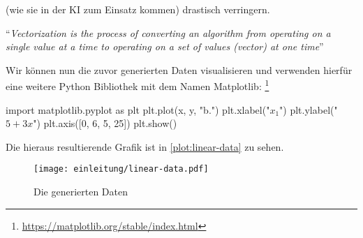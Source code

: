(wie sie in der KI zum Einsatz kommen) drastisch verringern.
\begin{aquote}{\parencite{online:vectorization}}
  \enquote{\textit{Vectorization is the process of converting an algorithm
      from operating on a single value at a time to
      operating on a set of values (vector) at one time}}
\end{aquote}
Wir können nun die zuvor generierten Daten visualisieren und verwenden hierfür
eine weitere Python Bibliothek mit dem Namen Matplotlib:
\footnote{\url{https://matplotlib.org/stable/index.html}}
\begin{pythoncode}
import matplotlib.pyplot as plt
plt.plot(x, y, "b.")
plt.xlabel("$x_1$")
plt.ylabel("$5 + 3x$")
plt.axis([0, 6, 5, 25])
plt.show()
\end{pythoncode}
\noindent
Die hieraus resultierende Grafik ist in \autoref{plot:linear-data} zu sehen.
\begin{figure}[!h]
  \centering
  \texttt{[image: einleitung/linear-data.pdf]}
  \caption{Die generierten Daten}
  \label{plot:linear-data}
\end{figure}

